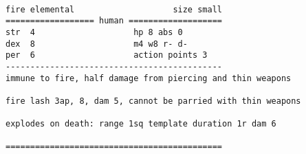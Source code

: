 \

\goodbreak \small \begin{samepage} \begin{verbatim}
fire elemental                    size small
================== human ===================
str  4                    hp 8 abs 0
dex  8                    m4 w8 r- d-
per  6                    action points 3
--------------------------------------------
immune to fire, half damage from piercing and thin weapons

fire lash 3ap, 8, dam 5, cannot be parried with thin weapons

explodes on death: range 1sq template duration 1r dam 6

============================================
\end{verbatim} \end{samepage} \normalsize

\flushbottom































































\newpage
